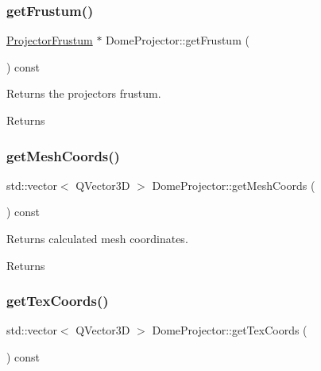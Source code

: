 \subsubsection{\texorpdfstring{get\+Frustum()}{getFrustum()}}
{\footnotesize\ttfamily \mbox{\hyperlink{class_projector_frustum}{Projector\+Frustum}} $\ast$ Dome\+Projector\+::get\+Frustum (\begin{DoxyParamCaption}{ }\end{DoxyParamCaption}) const}

Returns the projectors frustum. \begin{DoxyReturn}{Returns}

\end{DoxyReturn}
\mbox{\label{class_dome_projector_a7289aa1fc872437e0ce0ced081f3ca87}} 
\subsubsection{\texorpdfstring{get\+Mesh\+Coords()}{getMeshCoords()}}
{\footnotesize\ttfamily std\+::vector$<$ Q\+Vector3D $>$ Dome\+Projector\+::get\+Mesh\+Coords (\begin{DoxyParamCaption}{ }\end{DoxyParamCaption}) const}



Returns calculated mesh coordinates. 

\begin{DoxyReturn}{Returns}

\end{DoxyReturn}
\mbox{\label{class_dome_projector_abb4b7cda4a5e64e3069a1b5ace4a8ca2}} 
\subsubsection{\texorpdfstring{get\+Tex\+Coords()}{getTexCoords()}}
{\footnotesize\ttfamily std\+::vector$<$ Q\+Vector3D $>$ Dome\+Projector\+::get\+Tex\+Coords (\begin{DoxyParamCaption}{ }\end{DoxyParamCaption}) const}



